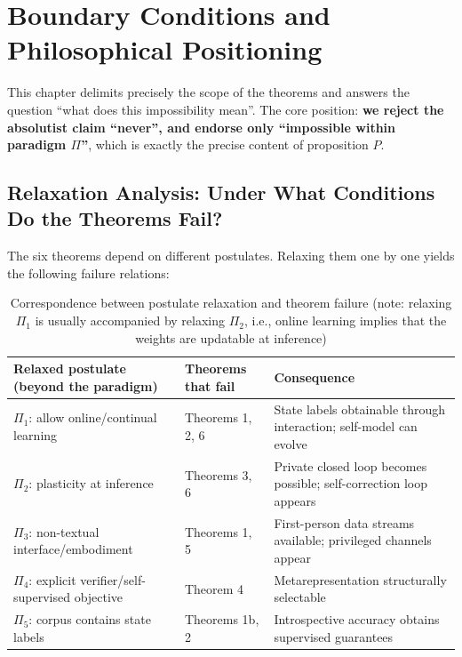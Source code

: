 \section{Boundary Conditions and Philosophical Positioning}

This chapter delimits precisely the scope of the theorems and answers the question ``what does
this impossibility mean''. The core position: \textbf{we reject the absolutist claim
``never'', and endorse only ``impossible within paradigm $\Pi$''}, which is exactly the
precise content of proposition $P$.

\subsection{Relaxation Analysis: Under What Conditions Do the Theorems Fail?}

The six theorems depend on different postulates. Relaxing them one by one yields the following
failure relations:

\begin{table}[htbp]
\centering
\caption{Correspondence between postulate relaxation and theorem failure (note: relaxing
$\Pi_1$ is usually accompanied by relaxing $\Pi_2$, i.e., online learning implies that the
weights are updatable at inference) \label{tab:relax}}
\begin{tabular}{p{5.4cm}p{4.4cm}p{4.6cm}}
\toprule
Relaxed postulate (beyond the paradigm) & Theorems that fail & Consequence \\
\midrule
$\Pi_1$: allow online/continual learning & Theorems 1, 2, 6 & State labels obtainable through interaction; self-model can evolve \\
$\Pi_2$: plasticity at inference & Theorems 3, 6 & Private closed loop becomes possible; self-correction loop appears \\
$\Pi_3$: non-textual interface/embodiment & Theorems 1, 5 & First-person data streams available; privileged channels appear \\
$\Pi_4$: explicit verifier/self-supervised objective & Theorem 4 & Metarepresentation structurally selectable \\
$\Pi_5$: corpus contains state labels & Theorems 1b, 2 & Introspective accuracy obtains supervised guarantees \\
\bottomrule
\end{tabular}
\end{table}


